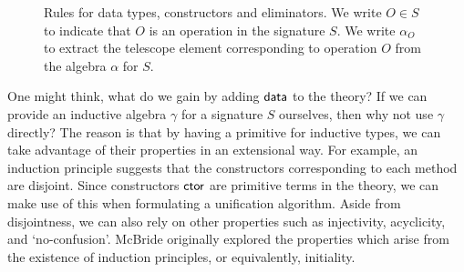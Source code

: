 \begin{figure}[t]
\caption{Rules for data types, constructors and eliminators. We write $O \in S$
to indicate that $O$ is an operation in the signature $S$. We write $\alpha_O$
to extract the telescope element corresponding to operation $O$ from the algebra
$\alpha$ for $S$.}
\label{fig:data-rules}
\end{figure}

One might think, what do we gain by adding $\textsf{data}$ to the theory? If we can
provide an inductive algebra $\gamma$ for a signature $S$ ourselves, then why
not use $\gamma$ directly? The reason is that by having a primitive for
inductive types, we can take advantage of their properties in an extensional
way. For example, an induction principle suggests that the constructors
corresponding to each method are disjoint. Since constructors $\textsf{ctor}$ are
primitive terms in the theory, we can make use of this when formulating a
unification algorithm. Aside from disjointness, we can also rely on other
properties such as injectivity, acyclicity, and `no-confusion'. McBride
\cite{McBride2006-fp} originally explored the properties which arise from the
existence of induction principles, or equivalently, initiality.

